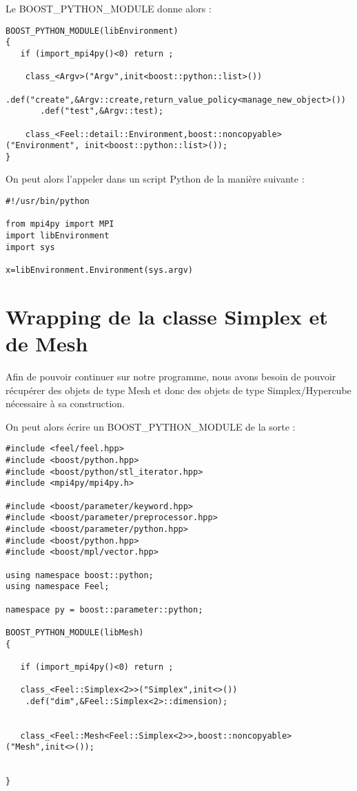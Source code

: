 \documentclass[12pt]{article}
\begin{document}
Le BOOST\_PYTHON\_MODULE donne alors :

\begin{lstlisting}
BOOST_PYTHON_MODULE(libEnvironment)
{
   if (import_mpi4py()<0) return ;
  
    class_<Argv>("Argv",init<boost::python::list>())
       .def("create",&Argv::create,return_value_policy<manage_new_object>())
       .def("test",&Argv::test);

    class_<Feel::detail::Environment,boost::noncopyable>("Environment", init<boost::python::list>());
}
\end{lstlisting}

On peut alors l'appeler dans un script Python de la manière suivante :
\begin{lstlisting}
#!/usr/bin/python

from mpi4py import MPI
import libEnvironment
import sys

x=libEnvironment.Environment(sys.argv)
\end{lstlisting}

\section{Wrapping de la classe Simplex et de Mesh}

Afin de pouvoir continuer sur notre programme, nous avons besoin de pouvoir récupérer des objets de type Mesh et donc des objets de type Simplex/Hypercube nécessaire à sa construction.

On peut alors écrire un BOOST\_PYTHON\_MODULE de la sorte :
\begin{lstlisting}
#include <feel/feel.hpp>
#include <boost/python.hpp>
#include <boost/python/stl_iterator.hpp>
#include <mpi4py/mpi4py.h>

#include <boost/parameter/keyword.hpp>
#include <boost/parameter/preprocessor.hpp>
#include <boost/parameter/python.hpp>
#include <boost/python.hpp>
#include <boost/mpl/vector.hpp>

using namespace boost::python;
using namespace Feel;

namespace py = boost::parameter::python;

BOOST_PYTHON_MODULE(libMesh)
{
   
   if (import_mpi4py()<0) return ;
       
   class_<Feel::Simplex<2>>("Simplex",init<>())
    .def("dim",&Feel::Simplex<2>::dimension);
   
   
   class_<Feel::Mesh<Feel::Simplex<2>>,boost::noncopyable>("Mesh",init<>());

    
}
\end{lstlisting}
\end{document}
